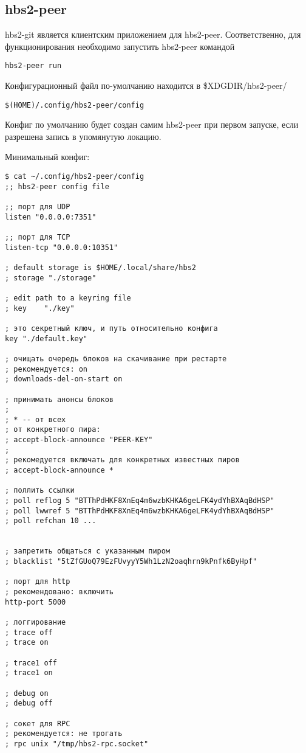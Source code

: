 \documentclass[11pt,a4paper]{article}
\begin{document}
\subsection{hbs2-peer}

hbs2-git является клиентским приложением для hbs2-peer.
Соответственно, для функционирования необходимо запустить hbs2-peer командой

\begin{verbatim}
hbs2-peer run
\end{verbatim}

Конфигурационный файл по-умолчанию находится в \$XDGDIR/hbs2-peer/

\begin{verbatim}
$(HOME)/.config/hbs2-peer/config
\end{verbatim}

Конфиг по умолчанию будет создан самим hbs2-peer при первом запуске,
если разрешена запись в упомянутую локацию.

Минимальный конфиг:

\begin{verbatim}
$ cat ~/.config/hbs2-peer/config
;; hbs2-peer config file

;; порт для UDP
listen "0.0.0.0:7351"

;; порт для TCP
listen-tcp "0.0.0.0:10351"

; default storage is $HOME/.local/share/hbs2
; storage "./storage"

; edit path to a keyring file
; key    "./key"

; это секретный ключ, и путь относительно конфига
key "./default.key"

; очищать очередь блоков на скачивание при рестарте
; рекомендуется: on
; downloads-del-on-start on

; принимать анонсы блоков
;
; * -- от всех
; от конкретного пира:
; accept-block-announce "PEER-KEY"
;
; рекомедуется включать для конкретных известных пиров
; accept-block-announce *

; поллить ссылки
; poll reflog 5 "BTThPdHKF8XnEq4m6wzbKHKA6geLFK4ydYhBXAqBdHSP"
; poll lwwref 5 "BTThPdHKF8XnEq4m6wzbKHKA6geLFK4ydYhBXAqBdHSP"
; poll refchan 10 ...


; запретить общаться с указанным пиром
; blacklist "5tZfGUoQ79EzFUvyyY5Wh1LzN2oaqhrn9kPnfk6ByHpf"

; порт для http
; рекомендовано: включить
http-port 5000

; логгирование
; trace off
; trace on

; trace1 off
; trace1 on

; debug on
; debug off

; сокет для RPC
; рекомендуется: не трогать
; rpc unix "/tmp/hbs2-rpc.socket"

\end{verbatim}
\end{document}
